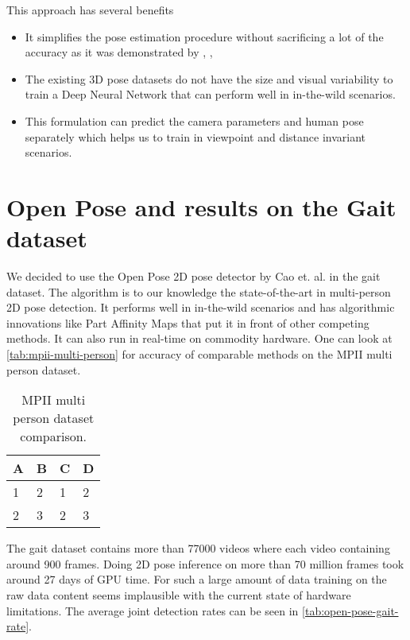 This approach has several benefits
\begin{itemize}
    \item It simplifies the pose estimation procedure without sacrificing a lot of the accuracy as it was demonstrated by \parencite{martinez2017simple}, \parencite{sun2017compositional}, \parencite{hossain2017exploiting}
    \item The existing 3D pose datasets do not have the size and visual variability to train a Deep Neural Network that can perform well in in-the-wild scenarios.
    \item This formulation can predict the camera parameters and human pose separately which helps us to train in viewpoint and distance invariant scenarios.
\end{itemize}

\section{Open Pose and results on the Gait dataset}

We decided to use the Open Pose 2D pose detector by Cao et. al. \parencite{cao2016realtime} in the gait dataset. The algorithm is to our knowledge the state-of-the-art in multi-person 2D pose detection. It performs well in in-the-wild scenarios and has algorithmic innovations like Part Affinity Maps that put it in front of other competing methods. It can also run in real-time on commodity hardware. One can look at \autoref{tab:mpii-multi-person} for accuracy of comparable methods on the MPII multi person dataset.

\begin{table}[htpb]
    \centering
    \begin{tabular}{l l l l}
      \toprule
        A & B & C & D \\
      \midrule
        1 & 2 & 1 & 2 \\
        2 & 3 & 2 & 3 \\
      \bottomrule
    \end{tabular}
    \caption[2D Pose Comparison]{MPII multi person dataset comparison.}\label{tab:mpii-multi-person}
  \end{table}

The gait dataset contains more than 77000 videos where each video containing around 900 frames. Doing 2D pose inference on more than 70 million frames took around 27 days of GPU time. For such a large amount of data training on the raw data content seems implausible with the current state of hardware limitations. The average joint detection rates can be seen in \autoref{tab:open-pose-gait-rate}.

